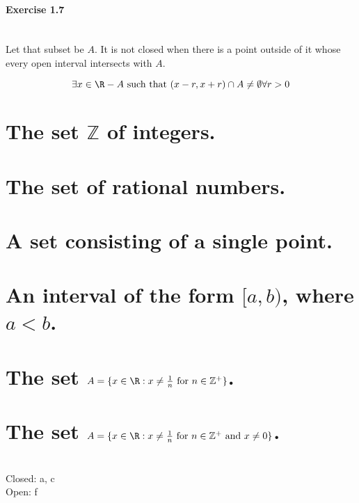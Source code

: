 \subsection{Exercise 1.7}
\setcounter{question}{0}


\begin{solution}
 \\Let that subset be $A$. It is not closed when there is a point outside of it whose every open interval intersects with $A$.
 
 $$\exists x \in \R - A \text{ such that } (x-r,x+r) \cap A \neq \emptyset \forall r > 0$$
\end{solution}


\begin{parts}
 
 \part{The set $\mathbb{Z}$ of integers.}
 \part{The set of rational numbers.}
 \part{A set consisting of a single point.}
 \part{An interval of the form $[a,b)$, where $a < b$.}
 \part{The set $A = \{x\in\R: x \neq \frac{1}{n} \text{ for } n \in \mathbb{Z}^+\}$.}
 \part{The set $A = \{x\in\R: x \neq \frac{1}{n} \text{ for } n \in \mathbb{Z}^+ \text{ and } x \neq 0\}$.}
 
 
\begin{solution}
 \\Closed: a, c \\
 Open: f
\end{solution}

\end{parts}

